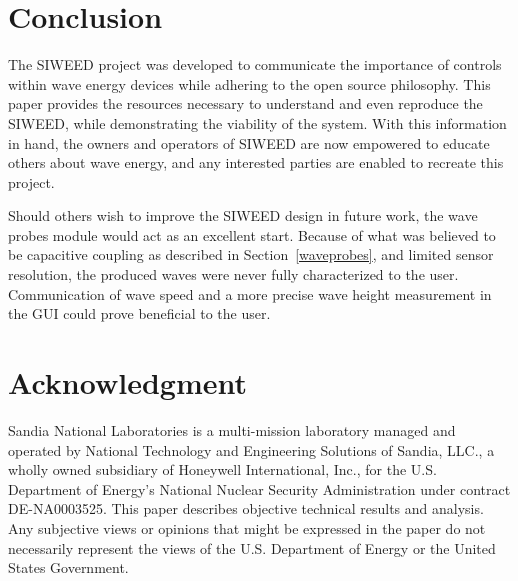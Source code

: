 \documentclass[11pt, letterpaper]{article}
\begin{document}
\section{Conclusion}
The SIWEED project was developed to communicate the importance of controls within wave energy devices while adhering to the open source philosophy. 
This paper provides the resources necessary to understand and even reproduce the SIWEED, while demonstrating the viability of the system. 
With this information in hand, the owners and operators of SIWEED are now empowered to educate others about wave energy, and any interested parties are enabled to recreate this project.

Should others wish to improve the SIWEED design in future work, the wave probes module would act as an excellent start.
Because of what was believed to be capacitive coupling as described in Section~\ref{waveprobes}, and limited sensor resolution, the produced waves were never fully characterized to the user.
Communication of wave speed and a more precise wave height measurement in the GUI could prove beneficial to the user. 

\section*{Acknowledgment}
Sandia National Laboratories is a multi-mission laboratory managed and operated by National Technology and Engineering Solutions of Sandia, LLC., a wholly owned subsidiary of Honeywell International, Inc., for the U.S. Department of Energy's National Nuclear Security Administration under contract DE-NA0003525.
This paper describes objective technical results and analysis.
Any subjective views or opinions that might be expressed in the paper do not necessarily represent the views of the U.S. Department of Energy or the United States Government.

\end{document}
